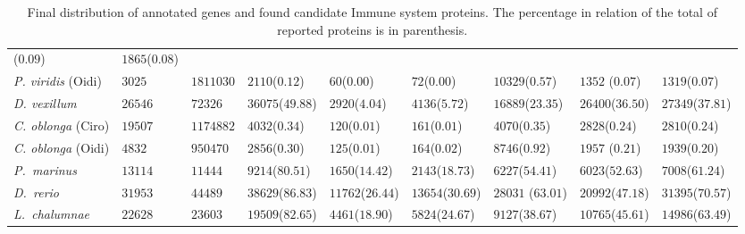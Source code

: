 \documentclass[11pt]{article}
\begin{document}
\begin{table}
\begin{tabular}{p{3.2cm}p{2cm}p{2cm}p{2cm}p{2cm}p{2cm}p{2cm}p{2.7cm}p{2.6cm}}
($0.09$)&$1865$($0.08$)\\
\textsl{P. viridis} (Oidi)&     
$3025$&$1811030$&$2110$($0.12$)&$60$($0.00$)&$72$($0.00$)&$10329$($0.57$)&$1352$
($0.07$)&$1319$($0.07$)\\
\textsl{D. vexillum}&
$26546$&$72326$&$36075$($49.88$)&$2920$($4.04$)&$4136$($5.72$)&$16889$($23.35$)&
$26400$($36.50$)&$27349$($37.81$)\\
\textsl{C. oblonga} (Ciro)&     
$19507$&$1174882$&$4032$($0.34$)&$120$($0.01$)&$161$($0.01$)&$4070$($0.35$)&$282
8$($0.24$)&$2810$($0.24$)\\
\textsl{C. oblonga} (Oidi)&     
$4832$&$950470$&$2856$($0.30$)&$125$($0.01$)&$164$($0.02$)&$8746$($0.92$)&$1957$
($0.21$)&$1939$($0.20$)\\
\midrule
\textsl{P.\ marinus}
&$13114$&$11444$&$9214$($80.51$)&$1650$($14.42$)&$2143$($18.73$)&$6227$($5
4.41$)&$6023$($52.63$)&$7008$($61.24$)\\
\textsl{D.\ rerio}
&$31953$&$44489$&$38629$($86.83$)&$11762$($26.44$)&$13654$($30.69$)&$28031$
($63.01$)&$20992$($47.18$)&$31395$($70.57$)\\
\textsl{L.\ chalumnae}
&$22628$&$23603$&$19509$($82.65$)&$4461$($18.90$)&$5824$($24.67$)&$9127$($3
8.67$)&$10765$($45.61$)&$14986$($63.49$)\\
\bottomrule
\end{tabular}
\caption{Final distribution of annotated genes and found candidate Immune 
system proteins. The percentage in relation of the total of reported proteins 
is in parenthesis.}
\label{table:distribution_prot}
\end{table}
\end{document}
